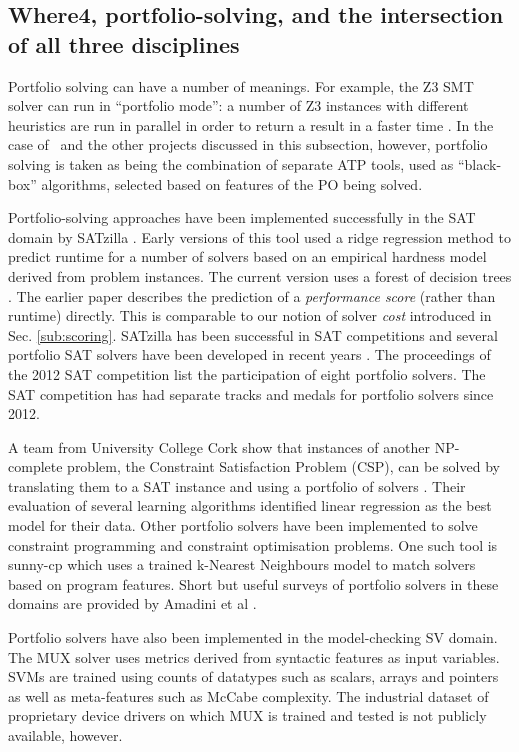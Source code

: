 \subsection{Where4, portfolio-solving, and the intersection of all three disciplines}
\label{sub:lrsvmmml}

Portfolio solving can have a number of meanings. For example, the Z3 SMT solver can run in ``portfolio mode'': a number of Z3 instances with different heuristics are run in parallel in order to return a result in a faster time \cite{WintersteigerHM09}. In the case of \where~and the other projects discussed in this subsection, however, portfolio solving is taken as being the combination of separate ATP tools, used as ``black-box'' algorithms, selected based on features of the PO being solved.

Portfolio-solving approaches have been implemented successfully in the SAT domain by SATzilla \cite{Satzilla}. Early versions of this tool used a ridge regression method to predict runtime for a number of solvers based on an empirical hardness model derived from problem instances. The current version \cite{SATzilla2012} uses a forest of decision trees . The earlier paper describes the prediction of a \textit{performance score} (rather than runtime) directly.  This is comparable to our notion of solver \textit{cost} introduced in Sec. \ref{sub:scoring}. SATzilla has been successful in SAT competitions and several portfolio SAT solvers have been developed in recent years \cite{SAT2012}.  The proceedings of the 2012 SAT competition 
list the participation of eight portfolio solvers. The SAT competition has had separate tracks and medals for portfolio solvers since 2012.  

A team from University College Cork show that instances of another NP-complete problem, the Constraint Satisfaction Problem (CSP), can be solved by translating them to a SAT instance and using a portfolio of solvers \cite{Hurley2014}. Their evaluation of several learning algorithms identified linear regression as the best model for their data.
Other portfolio solvers have been implemented to solve constraint programming and constraint optimisation problems. 
One such tool is sunny-cp \cite{sunny-cp} which uses a trained k-Nearest Neighbours model to match solvers based on program features.
Short but useful surveys of portfolio solvers in these domains are provided by Amadini et al \cite{Amadini2013, Amadini2016}.   

Portfolio solvers have also been implemented in the model-checking SV domain. The MUX \cite{MUX} solver uses metrics derived from syntactic features as input variables. SVMs are trained using counts of datatypes such as scalars, arrays and pointers as well as meta-features such as McCabe complexity. The industrial dataset of proprietary device drivers on which MUX is trained and tested is not publicly available, however.   

